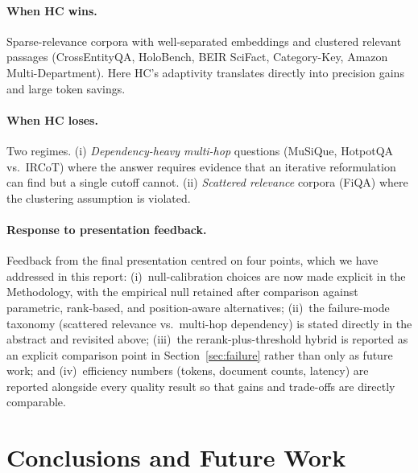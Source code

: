 \documentclass[letterpaper]{article}
\begin{document}
\paragraph{When HC wins.} Sparse-relevance corpora with
well-separated embeddings and clustered relevant passages
(CrossEntityQA, HoloBench, BEIR SciFact, Category-Key, Amazon
Multi-Department). Here HC's adaptivity translates directly into
precision gains and large token savings.

\paragraph{When HC loses.} Two regimes. (i) \emph{Dependency-heavy
multi-hop} questions (MuSiQue, HotpotQA vs.\ IRCoT) where the answer
requires evidence that an iterative reformulation can find but a
single cutoff cannot. (ii) \emph{Scattered relevance} corpora
(FiQA) where the clustering assumption is violated.

\paragraph{Response to presentation feedback.}
Feedback from the final presentation centred on four points, which
we have addressed in this report: (i)~null-calibration choices are
now made explicit in the Methodology, with the empirical null
retained after comparison against parametric, rank-based, and
position-aware alternatives; (ii)~the failure-mode taxonomy
(scattered relevance vs.\ multi-hop dependency) is stated directly in
the abstract and revisited above; (iii)~the rerank-plus-threshold
hybrid is reported as an explicit comparison point in
Section~\ref{sec:failure} rather than only as future work; and
(iv)~efficiency numbers (tokens, document counts, latency) are
reported alongside every quality result so that gains and trade-offs
are directly comparable.

\section{Conclusions and Future Work}
\label{sec:future}
\end{document}
